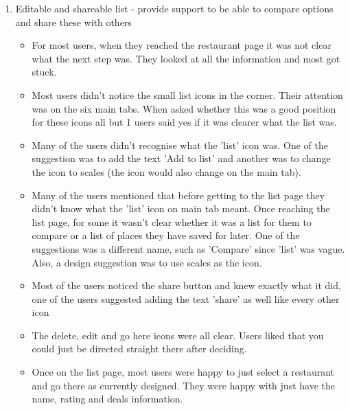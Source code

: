 \documentclass[a4 paper, 12pt]{article}
\begin{document}
\begin{enumerate}
    \item Editable and shareable list - provide support to be able to compare options and share these with others
        \begin{itemize}
             
            \item For most users, when they reached the restaurant page it was not clear what the next step was. They looked at all the information and most got stuck.
            \item Most users didn't notice the small list icons in the corner. Their attention was on the six main tabs. When asked whether this was a good position for these icons all but 1 users said yes if it was clearer what the list was.
            \item Many of the users didn't recognise what the 'list' icon was. One of the suggestion was to add the text 'Add to list' and another was to change the icon to scales (the icon would also change on the main tab). 
            \item Many of the users mentioned that before getting to the list page they didn't know what the 'list' icon on main tab meant. Once reaching the list page, for some it wasn't clear whether it was a list for them to compare or a list of places they have saved for later.  One of the suggestions was a different name, such as 'Compare' since 'list' was vague. Also, a design suggestion was to use scales as the icon. 
            \item Most of the users noticed the share button and knew exactly what it did, one of the users suggested adding the text 'share' as well like every other icon  
            \item The delete, edit and go here icons were all clear. Users liked that you could just be directed straight there after deciding. 
            \item Once on the list page, most users were happy to just select a restaurant and go there as currently designed. They were happy with just have the name, rating and deals information.
        \end{itemize}


\end{enumerate}
\end{document}
